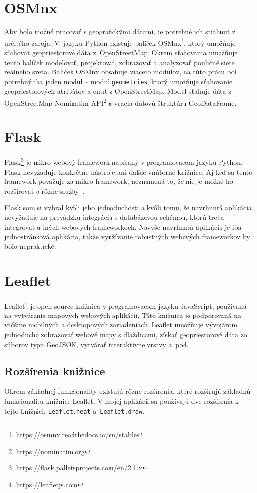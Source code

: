 \section{OSMnx}
Aby bolo možné pracovať s geografickými dátami, je potrebné ich stiahnuť z určitého zdroja. V~jazyku Python existuje balíček OSMnx\footnote{\url{https://osmnx.readthedocs.io/en/stable}}, ktorý umožňuje sťahovať geopriestorové dáta z~OpenStreetMap. Okrem sťahovania umožňuje tento balíček modelovať, projektovať, zobrazovať a analyzovať pouličné siete reálneho sveta. Balíček OSMnx obsahuje viacero modulov, na túto prácu bol potrebný iba jeden modul \--- modul \texttt{geometries}, ktorý  umožňuje sťahovanie geopriestorových atribútov a entít z OpenStreetMap. Modul sťahuje dáta z OpenStreetMap Nominatim API\footnote{\url{https://nominatim.org}} a vracia dátovú štruktúru GeoDataFrame.


\section{Flask}
Flask\footnote{\url{https://flask.palletsprojects.com/en/2.1.x}} je mikro webový framework napísaný v programovacom jazyku Python. Flask nevyžaduje konkrétne nástroje ani ďalšie vnútorné knižnice. Aj keď sa tento framework považuje za mikro framework, neznamená to, že nie je možné ho rozširovať o rôzne služby~\cite{Oreilly2014Flask}.

Flask som si vybral kvôli jeho jednoduchosti a kvôli tomu, že navrhnutá aplikácia nevyžaduje na prevádzku integráciu s databázovou schémou, ktorú treba integrovať u iných webových frameworkoch. Navyše navrhnutá aplikácia je iba jednostránková aplikácia, takže využívanie robustných webových frameworkov by bolo nepraktické.


\section{Leaflet}
Leaflet\footnote{\url{https://leafletjs.com}} je open-source knižnica v programovacom jazyku JavaScript, používaná na vytváranie mapových webových aplikácii. Táto knižnica je podporovaná na väčšine mobilných a desktopových zariadeniach. Leaflet umožňuje vývojárom jednoducho zobrazovať webové mapy s dlaždicami, získať geopriestorové dáta zo súborov typu GeoJSON, vytvárať interaktívne vrstvy a~pod.

\subsection{Rozšírenia knižnice}
Okrem základnej funkcionality existujú rôzne rozšírenia, ktoré rozširujú základnú funkcionalitu knižnice Leaflet. V mojej aplikácii sa používajú dve rozšírenia k tejto knižnici: \texttt{Leaflet.heat} a~\texttt{Leaflet.draw}. 

